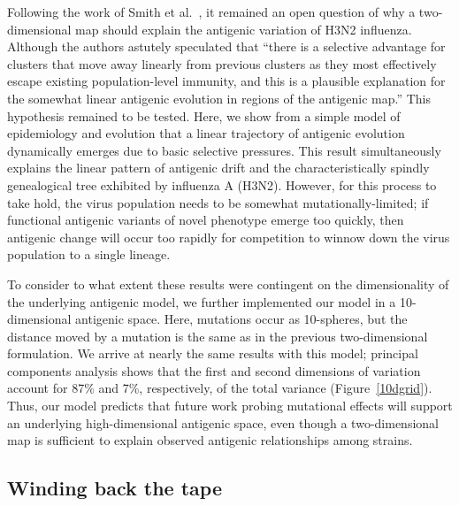 \documentclass[11pt,oneside,letterpaper]{article}
\begin{document}
Following the work of Smith et al.\ \cite{Smith04}, it remained an open question of why a two-dimensional map should explain the antigenic variation of H3N2 influenza.  Although the authors astutely speculated that ``there is a selective advantage for clusters that move away linearly from previous clusters as they most effectively escape existing population-level immunity, and this is a plausible explanation for the somewhat linear antigenic evolution in regions of the antigenic map.''  This hypothesis remained to be tested.  Here, we show from a simple model of epidemiology and evolution that a linear trajectory of antigenic evolution dynamically emerges due to basic selective pressures.  This result simultaneously explains the linear pattern of antigenic drift \cite{Smith04} and the characteristically spindly genealogical tree \cite{Fitch97} exhibited by influenza A (H3N2).  However, for this process to take hold, the virus population needs to be somewhat mutationally-limited; if functional antigenic variants of novel phenotype emerge too quickly, then antigenic change will occur too rapidly for competition to winnow down the virus population to a single lineage. 

To consider to what extent these results were contingent on the dimensionality of the underlying antigenic model, we further implemented our model in a 10-dimensional antigenic space.  Here, mutations occur as 10-spheres, but the distance moved by a mutation is the same as in the previous two-dimensional formulation.  We arrive at nearly the same results with this model; principal components analysis shows that the first and second dimensions of variation account for 87\% and 7\%, respectively, of the total variance (Figure~\ref{10dgrid}).  Thus, our model predicts that future work probing mutational effects will support an underlying high-dimensional antigenic space, even though a two-dimensional map is sufficient to explain observed antigenic relationships among strains.

\subsection*{Winding back the tape}
\end{document}
